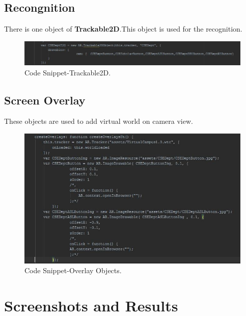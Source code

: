 \documentclass{article}
\begin{document}
\subsection{Recongnition}
\par There is one object of \textbf{Trackable2D}.This object is used for the recognition.
\begin{figure}[h]
	\includegraphics[width=\linewidth]{Trackable2D.jpg}
	\caption{Code Snippet-Trackable2D. }
\end{figure}
{\clearpage
\subsection{Screen Overlay}
\par These objects are used to add virtual world on  camera view.
\begin{figure}[h]
	\includegraphics[scale=.5]{ScreenOverlay.jpg}
	\caption{Code Snippet-Overlay Objects. }
\end{figure}
}











\pagebreak
\newpage

\section{Screenshots and Results}
\end{document}
